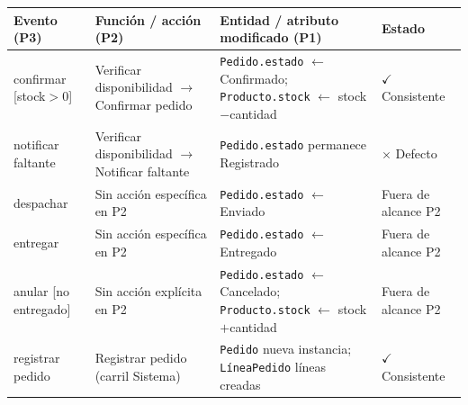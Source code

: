 \documentclass{article}
\begin{document}
\begin{table}[H]
\centering
\small
\setlength{\tabcolsep}{4pt}
\begin{tabular}{|p{2.8cm}|p{3.5cm}|p{4cm}|p{2cm}|}
\hline
\rowcolor{lightblue}
\textbf{Evento (P3)} & \textbf{Función / acción (P2)} & \textbf{Entidad / atributo modificado (P1)} & \textbf{Estado} \\
\hline
confirmar {[}stock$>$0{]}
  & Verificar disponibilidad $\rightarrow$ Confirmar pedido
  & \texttt{Pedido.estado} $\leftarrow$ Confirmado; \texttt{Producto.stock} $\leftarrow$ stock$-$cantidad
  & \cellcolor{lightgreen}$\checkmark$ Consistente \\
\hline
notificar faltante
  & Verificar disponibilidad $\rightarrow$ Notificar faltante
  & \texttt{Pedido.estado} permanece Registrado
  & \cellcolor{lightred}$\times$ Defecto \\
\hline
despachar
  & Sin acción específica en P2
  & \texttt{Pedido.estado} $\leftarrow$ Enviado
  & \cellcolor{lightyellow}Fuera de alcance P2 \\
\hline
entregar
  & Sin acción específica en P2
  & \texttt{Pedido.estado} $\leftarrow$ Entregado
  & \cellcolor{lightyellow}Fuera de alcance P2 \\
\hline
anular {[}no entregado{]}
  & Sin acción explícita en P2
  & \texttt{Pedido.estado} $\leftarrow$ Cancelado; \texttt{Producto.stock} $\leftarrow$ stock$+$cantidad
  & \cellcolor{lightyellow}Fuera de alcance P2 \\
\hline
registrar pedido
  & Registrar pedido (carril Sistema)
  & \texttt{Pedido} nueva instancia; \texttt{LíneaPedido} líneas creadas
  & \cellcolor{lightgreen}$\checkmark$ Consistente \\
\hline
\end{tabular}
\end{table}



\end{document}

